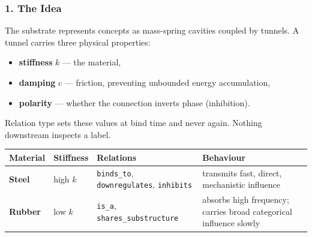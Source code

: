 \documentclass[
  11pt,
  a4paper,
]{article}
\providecommand{\tightlist}{%
  \setlength{\itemsep}{0pt}\setlength{\parskip}{0pt}}
\begin{document}
\subsubsection{1. The Idea}\label{the-idea}

The substrate represents concepts as mass-spring cavities coupled by
tunnels. A tunnel carries three physical properties:

\begin{itemize}
\tightlist
\item
  \textbf{stiffness} \(k\) --- the material,
\item
  \textbf{damping} \(c\) --- friction, preventing unbounded energy
  accumulation,
\item
  \textbf{polarity} --- whether the connection inverts phase
  (inhibition).
\end{itemize}

Relation type sets these values at bind time and never again. Nothing
downstream inspects a label.

\begin{longtable}[]{@{}
  >{\raggedright\arraybackslash}p{}
  >{\raggedright\arraybackslash}p{}
  >{\raggedright\arraybackslash}p{}
  >{\raggedright\arraybackslash}p{}@{}}
\toprule\noalign{}
\begin{minipage}[b]{\linewidth}\raggedright
Material
\end{minipage} & \begin{minipage}[b]{\linewidth}\raggedright
Stiffness
\end{minipage} & \begin{minipage}[b]{\linewidth}\raggedright
Relations
\end{minipage} & \begin{minipage}[b]{\linewidth}\raggedright
Behaviour
\end{minipage} \\
\midrule\noalign{}
\endhead
\bottomrule\noalign{}
\endlastfoot
\textbf{Steel} & high \(k\) & \texttt{binds\_to},
\texttt{downregulates}, \texttt{inhibits} & transmits fast, direct,
mechanistic influence \\
\textbf{Rubber} & low \(k\) & \texttt{is\_a},
\texttt{shares\_substructure} & absorbs high frequency; carries broad
categorical influence slowly \\
\end{longtable}
\end{document}
